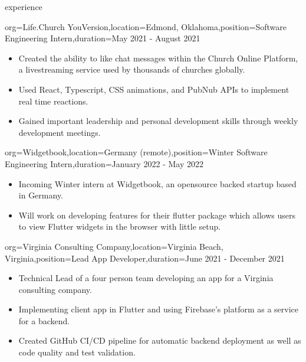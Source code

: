 \documentclass{resume}
\begin{document}
\begin{ResumeSection}{experience}
    \begin{ResumeSubsection}{org={Life.Church YouVersion},location={Edmond, Oklahoma},position={Software Engineering Intern},duration={May 2021 - August 2021}}
        \begin{itemize}
            \item {Created the ability to like chat messages within
                    the Church Online Platform, a livestreaming service used by
                thousands of churches globally.}
            \item {Used React, Typescript, CSS animations, and
                PubNub APIs to implement real time reactions.}
            \item Gained important leadership and personal development skills
                through weekly development meetings.
        \end{itemize}
    \end{ResumeSubsection}

    \begin{ResumeSubsection}{org={Widgetbook},location={Germany (remote)},position={Winter Software Engineering Intern},duration={January 2022 - May 2022}}
        \begin{itemize}
            \item Incoming Winter intern at Widgetbook, an opensource backed startup based in Germany.
            \item Will work on developing features for their flutter package which allows users to view Flutter widgets in the browser with little setup.
        \end{itemize}
    \end{ResumeSubsection}

    \begin{ResumeSubsection}{org={Virginia Consulting Company},location={Virginia Beach, Virginia},position={Lead App Developer},duration={June 2021 - December 2021}}
        \begin{itemize}
            \item {Technical Lead of a four person team developing an app for a Virginia consulting company.}
            \item {Implementing client app in Flutter and using Firebase's platform as a service for a backend.}
            \item {Created GitHub CI/CD pipeline for automatic backend deployment as well as code quality and test validation.}
        \end{itemize}
    \end{ResumeSubsection}



\end{ResumeSection}
\end{document}
